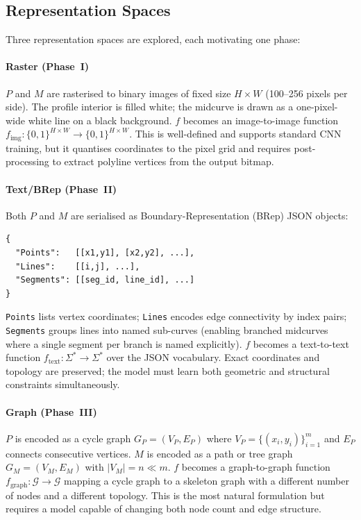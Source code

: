 \documentclass[journal]{IEEEtran}
\begin{document}
\subsection{Representation Spaces}

Three representation spaces are explored, each motivating one phase:

\paragraph{Raster (Phase~I)} $P$ and $M$ are rasterised to binary images of
fixed size $H \times W$ (100--256 pixels per side).  The profile interior is
filled white; the midcurve is drawn as a one-pixel-wide white line on a black
background.  $f$ becomes an image-to-image function
$f_{\text{img}}: \{0,1\}^{H \times W} \to \{0,1\}^{H \times W}$.
This is well-defined and supports standard CNN training, but it quantises
coordinates to the pixel grid and requires post-processing to extract polyline
vertices from the output bitmap.

\paragraph{Text/BRep (Phase~II)} Both $P$ and $M$ are serialised as
Boundary-Representation (BRep) JSON objects:
\begin{lstlisting}[language={}]
{
  "Points":   [[x1,y1], [x2,y2], ...],
  "Lines":    [[i,j], ...],
  "Segments": [[seg_id, line_id], ...]
}
\end{lstlisting}
\texttt{Points} lists vertex coordinates; \texttt{Lines} encodes edge
connectivity by index pairs; \texttt{Segments} groups lines into named
sub-curves (enabling branched midcurves where a single segment per branch is
named explicitly).  $f$ becomes a text-to-text function
$f_{\text{text}}: \Sigma^* \to \Sigma^*$ over the JSON vocabulary.
Exact coordinates and topology are preserved; the model must learn both
geometric and structural constraints simultaneously.

\paragraph{Graph (Phase~III)} $P$ is encoded as a cycle graph
$G_P = (V_P, E_P)$ where $V_P = \{(x_i, y_i)\}_{i=1}^{m}$ and $E_P$
connects consecutive vertices.  $M$ is encoded as a path or tree graph
$G_M = (V_M, E_M)$ with $|V_M| = n \ll m$.  $f$ becomes a graph-to-graph
function $f_{\text{graph}}: \mathcal{G} \to \mathcal{G}$ mapping a cycle graph
to a skeleton graph with a different number of nodes and a different topology.
This is the most natural formulation but requires a model capable of changing
both node count and edge structure.
\end{document}
